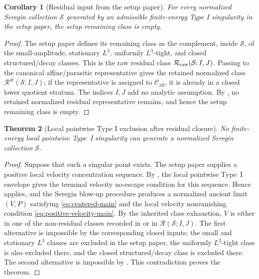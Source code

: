 \documentclass[11pt]{amsart}
\numberwithin{equation}{section}
\theoremstyle{plain}
\newtheorem{theorem}{Theorem}[section]
\newtheorem{corollary}[theorem]{Corollary}
\theoremstyle{definition}
\theoremstyle{remark}
\newcommand{\calS}{\mathcal S}
\newcommand{\calR}{\mathcal R}
\newcommand{\Caff}{\mathcal C_{\mathrm{aff}}}
\begin{document}
\begin{corollary}[Residual input from the setup paper]
\label{cor:paperI-residual-input}
For every normalized Seregin collection \(\calS\) generated by an
admissible finite-energy Type I singularity in the setup paper, the setup
remaining class is empty.
\end{corollary}

\begin{proof}
The setup paper defines its remaining class as the complement, inside \(\calS\), of
the small-amplitude, stationary \(L^3\), uniformly \(L^3\)-tight, and closed
structured/decay classes.  This is the raw residual class
\(\calR_{\rm raw}(\calS;I,J)\).  Passing to the canonical affine/parasitic
representative gives the retained normalized class \(\calR^\#(\calS;I,J)\);
if the representative is assigned to \(\Caff\), it is already in a closed lower
quotient stratum.  The indices \(I,J\) add no analytic assumption.  By
, no retained normalized residual
representative remains, and hence the setup remaining class is empty.
\end{proof}

\begin{theorem}[Local pointwise Type I exclusion after residual closure]
\label{thm:typeI-exclusion-main}
No finite-energy local pointwise Type~I singularity can generate a normalized
Seregin collection \(\calS\).
\end{theorem}

\begin{proof}
Suppose that such a singular point exists.  The setup paper supplies a
positive local velocity concentration sequence.  By
,
the local pointwise Type~I envelope gives the terminal velocity
no-escape condition for this sequence.  Hence
 applies, and the Seregin blow-up procedure
produces a
normalized ancient limit \((V,P)\) satisfying \eqref{eq:centered-main} and the
local velocity nonvanishing condition \eqref{eq:positive-velocity-main}.  By
the inherited class exhaustion, \(V\) is either in one of the non-residual
classes recorded in  or in
\(\calR(\calS;I,J)\).  The first alternative is impossible by the corresponding
closed inputs: the small and stationary \(L^3\) classes are excluded in the setup
paper, the uniformly \(L^3\)-tight class is also excluded there, and the
closed structured/decay class is excluded there.  The second alternative is
impossible by .  This contradiction proves
the theorem.
\end{proof}
\end{document}
